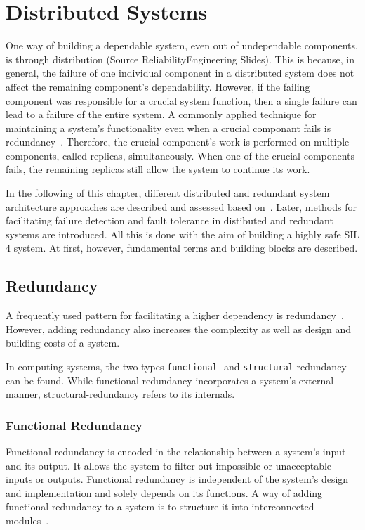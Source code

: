 \section{Distributed Systems}

One way of building a dependable system, even out of undependable components, is through distribution (Source ReliabilityEngineering Slides).
This is because, in general, the failure of one individual component in a distributed system does not affect the remaining component's dependability.
However, if the failing component was responsible for a crucial system function, then a single failure can lead to a failure of the entire system.
A commonly applied technique for maintaining a system's functionality even when a crucial componant fails is redundancy~\cite{TanenbaumSteen07}.
Therefore, the crucial component's work is performed on multiple components, called replicas, simultaneously.
When one of the crucial components fails, the remaining replicas still allow the system to continue its work.

In the following of this chapter, different distributed and redundant system architecture approaches are described and assessed based on~.
Later, methods for facilitating failure detection and fault tolerance in distibuted and redundant systems are introduced.
All this is done with the aim of building a highly safe \gls*{SIL} 4 system.
At first, however, fundamental terms and building blocks are described.

\subsection{Redundancy}
A frequently used pattern for facilitating a higher dependency is redundancy~\cite{GeffroyMotetDependableComputing}.
However, adding redundancy also increases the complexity as well as design and building costs of a system.

In computing systems, the two types \texttt{functional}- and \texttt{structural}-redundancy can be found.
While functional-redundancy incorporates a system's external manner, structural-redundancy refers to its internals.

\subsubsection{Functional Redundancy}
Functional redundancy is encoded in the relationship between a system's input and its output.
It allows the system to filter out impossible or unacceptable inputs or outputs.
Functional redundancy is independent of the system's design and implementation and solely depends on its functions.
A way of adding functional redundancy to a system is to structure it into interconnected modules~\cite{GeffroyMotetDependableComputing}.

